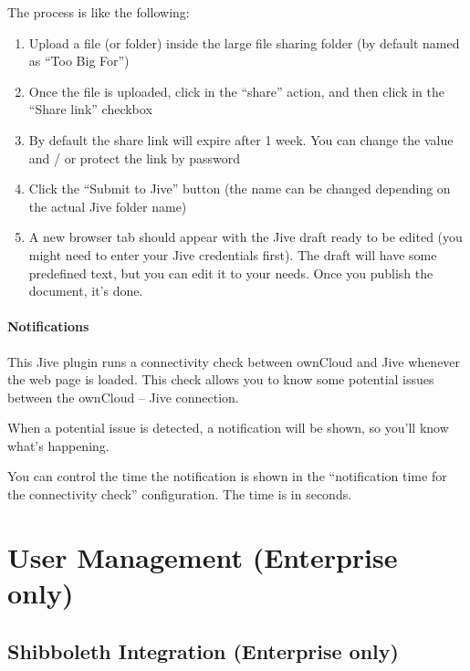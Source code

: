 \documentclass[letterpaper,10pt,english]{sphinxmanual}
\begin{document}
The process is like the following:
\begin{enumerate}
\item {} 
Upload a file (or folder) inside the large file sharing folder (by default named as “Too Big For”)

\item {} 
Once the file is uploaded, click in the “share” action, and then click in the “Share link” checkbox

\item {} 
By default the share link will expire after 1 week. You can change the value and / or protect the link by password

\item {} 
Click the “Submit to Jive” button (the name can be changed depending on the actual Jive folder name)

\item {} 
A new browser tab should appear with the Jive draft ready to be edited (you might need to enter your
Jive credentials first). The draft will have some predefined text, but you can edit it to your needs.
Once you publish the document, it's done.

\end{enumerate}


\paragraph{Notifications}
\label{enterprise_external_storage/jive_configuration:notifications}
This Jive plugin runs a connectivity check between ownCloud and Jive whenever the web page is loaded. This
check allows you to know some potential issues between the ownCloud – Jive connection.

When a potential issue is detected, a notification will be shown, so you'll know what's happening.

You can control the time the notification is shown in the “notification time for the connectivity check”
configuration. The time is in seconds.


\section{User Management (Enterprise only)}
\label{enterprise_user_management/index:user-management-enterprise-only}\label{enterprise_user_management/index::doc}

\subsection{Shibboleth Integration (Enterprise only)}
\label{enterprise_user_management/user_auth_shibboleth:shibboleth-integration-enterprise-only}\label{enterprise_user_management/user_auth_shibboleth::doc}
\end{document}
